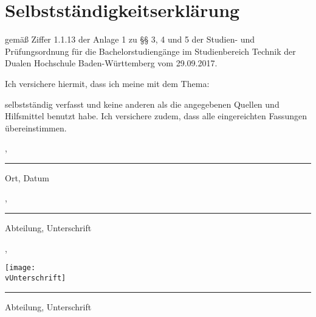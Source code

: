 \thispagestyle{empty}
\section*{\Huge{Selbstständigkeitserklärung}}

gemäß Ziffer 1.1.13 der Anlage 1 zu §§ 3, 4 und 5  der Studien- und Prüfungsordnung für die Bachelorstudiengänge im Studienbereich Technik der Dualen Hochschule Baden-Würt­tem­berg vom 29.09.2017.

\noindent Ich versichere hiermit, dass ich meine \vArbeitstyp{} mit dem Thema: 
\begin{center}
	\Large\textbf{\vTitel}
\end{center}
selbstständig verfasst und keine anderen als die angegebenen Quellen und Hilfsmittel benutzt habe. Ich versichere zudem, dass alle eingereichten Fassungen übereinstimmen.

\vfill
\leavevmode
\newline
\parbox{6cm}{\strut\centering \vBearbeitungsort, \vAbgabedatum\hrule\strut\centering\footnotesize Ort, Datum} 
\hfill
\ifx\vUnterschrift\empty
\parbox{6cm}{\strut\hspace{1pt} \vAbteilung, \hrule\strut\centering\footnotesize Abteilung, Unterschrift}
\else
\parbox{6cm}{\strut\centering\hspace{1pt} \vAbteilung, \parbox[b]{3cm}{\vspace{-10cm}\texttt{[image: \\vUnterschrift]}}\hrule\strut\centering\footnotesize Abteilung, Unterschrift}
\fi
\vspace{1cm}

\newpage